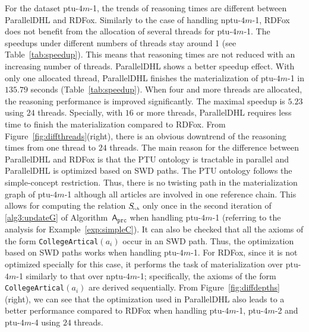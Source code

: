 For the dataset ptu-$4m$-1, the trends of reasoning times are different
between ParallelDHL and RDFox.
Similarly to the case of handling nptu-$4m$-1,
RDFox does not benefit from the allocation of several threads for ptu-$4m$-1. The speedups under different numbers of threads stay around 1 (see Table~\ref{tab:speedup}).
This means that reasoning times are not reduced with an increasing number of threads.
ParallelDHL shows a better speedup effect. With only one allocated thread, ParallelDHL finishes
the materialization of ptu-$4m$-1 in $135.79$ seconds (Table~\ref{tab:speedup}). When four and more threads
are allocated, the reasoning performance is improved significantly.
The maximal speedup is $5.23$ using $24$ threads.
Specially, with $16$ or more threads, ParallelDHL
requires less time to finish the materialization compared to RDFox.
From Figure~\ref{fig:diffthreads}(right), there is an obvious downtrend of the reasoning times
from one thread to $24$ threads.
The main reason for the difference between ParallelDHL and RDFox
is that the PTU ontology is tractable in parallel and ParallelDHL
is optimized based on SWD paths. The PTU ontology follows the
simple-concept restriction. Thus, there is no twisting path in
the materialization graph of ptu-$4m$-1 although all articles are involved
in one reference chain. This allows for computing the relation $S_{\textit{\!\tiny
    rch}}$ only once in the second iteration of \ref{alg3:updateG} of Algorithm~$\mathsf{A}_{\texttt{prc}}$
when handling ptu-$4m$-1 (referring to the analysis for Example~\ref{exp:simpleC}).
It can also be checked that all the axioms of the form \texttt{CollegeArtical}$(a_i)$ occur in
an SWD path. Thus, the optimization based on SWD paths works when handling ptu-$4m$-1.
For RDFox, since it is not optimized specially for this case, it performs the task of
materialization over ptu-$4m$-1 similarly to that over nptu-$4m$-1;
specifically, the axioms of the form \texttt{CollegeArtical}$(a_i)$ are derived sequentially.
From Figure~\ref{fig:diffdepths}(right), we can see that the optimization used in ParallelDHL
also leads to a better performance compared to
RDFox when handling ptu-$4m$-1, ptu-$4m$-2 and ptu-$4m$-4 using $24$ threads.

